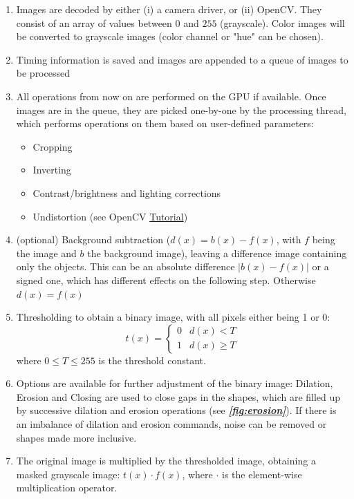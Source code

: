 \documentclass[9pt,lineno]{elife}
\newcommand{\figref}[1]{\textit{\textbf{\ref{#1}}}}
\begin{document}
\begin{appendixbox}
\begin{enumerate}
    \item Images are decoded by either (i) a camera driver, or (ii) OpenCV. They consist of an array of values between $0$ and $255$ (grayscale). Color images will be converted to grayscale images (color channel or "hue" can be chosen).
    \item Timing information is saved and images are appended to a queue of images to be processed
    \item All operations from now on are performed on the GPU if available. Once images are in the queue, they are picked one-by-one by the processing thread, which performs operations on them based on user-defined parameters:
    \begin{itemize}
        \item Cropping
        \item Inverting
        \item Contrast/brightness and lighting corrections
        \item Undistortion (see OpenCV \href{https://docs.opencv.org/3.4/dc/dbb/tutorial_py_calibration.html}{Tutorial})
    \end{itemize}
    \item (optional) Background subtraction ($d(x) = b(x) - f(x)$, with $f$ being the image and $b$ the background image), leaving a difference image containing only the objects. This can be an absolute difference $|b(x)-f(x)|$ or a signed one, which has different effects on the following step. Otherwise $d(x) = f(x)$
    \item Thresholding to obtain a binary image, with all pixels either being 1 or 0:
    $$ t(x) = \begin{cases} 0 & d(x) < T \\ 1 & d(x) \ge T \end{cases} $$
    where $0\leq T\leq 255$ is the threshold constant.
    \item Options are available for further adjustment of the binary image: Dilation, Erosion and Closing are used to close gaps in the shapes, which are filled up by successive dilation and erosion operations (see \figref{fig:erosion}). If there is an imbalance of dilation and erosion commands, noise can be removed or shapes made more inclusive.
    \item The original image is multiplied by the thresholded image, obtaining a masked grayscale image: $t(x)\cdot f(x)$, where $\cdot$ is the element-wise multiplication operator.
\end{enumerate}


\end{appendixbox}
\end{document}
